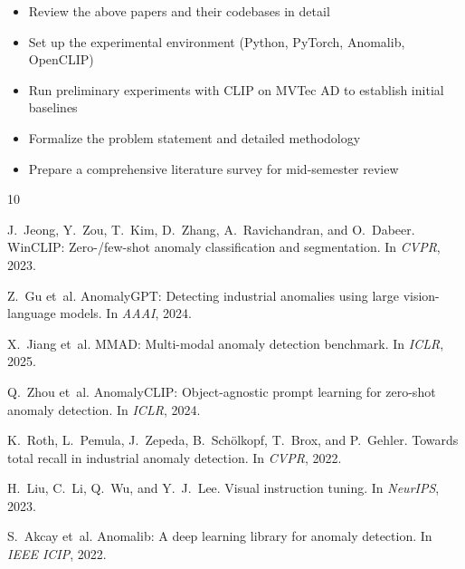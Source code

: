 \documentclass[12pt, a4paper]{article}
\begin{document}
\begin{itemize}[leftmargin=*]
    \item Review the above papers and their codebases in detail
    \item Set up the experimental environment (Python, PyTorch, Anomalib, OpenCLIP)
    \item Run preliminary experiments with CLIP on MVTec AD to establish initial baselines
    \item Formalize the problem statement and detailed methodology
    \item Prepare a comprehensive literature survey for mid-semester review
\end{itemize}

\begin{thebibliography}{10}

J.~Jeong, Y.~Zou, T.~Kim, D.~Zhang, A.~Ravichandran, and O.~Dabeer.
\newblock WinCLIP: Zero-/few-shot anomaly classification and segmentation.
\newblock In \emph{CVPR}, 2023.

Z.~Gu et~al.
\newblock AnomalyGPT: Detecting industrial anomalies using large vision-language models.
\newblock In \emph{AAAI}, 2024.

X.~Jiang et~al.
\newblock MMAD: Multi-modal anomaly detection benchmark.
\newblock In \emph{ICLR}, 2025.

Q.~Zhou et~al.
\newblock AnomalyCLIP: Object-agnostic prompt learning for zero-shot anomaly detection.
\newblock In \emph{ICLR}, 2024.

K.~Roth, L.~Pemula, J.~Zepeda, B.~Sch{\"o}lkopf, T.~Brox, and P.~Gehler.
\newblock Towards total recall in industrial anomaly detection.
\newblock In \emph{CVPR}, 2022.

H.~Liu, C.~Li, Q.~Wu, and Y.~J.~Lee.
\newblock Visual instruction tuning.
\newblock In \emph{NeurIPS}, 2023.

S.~Akcay et~al.
\newblock Anomalib: A deep learning library for anomaly detection.
\newblock In \emph{IEEE ICIP}, 2022.

\end{thebibliography}
\end{document}
